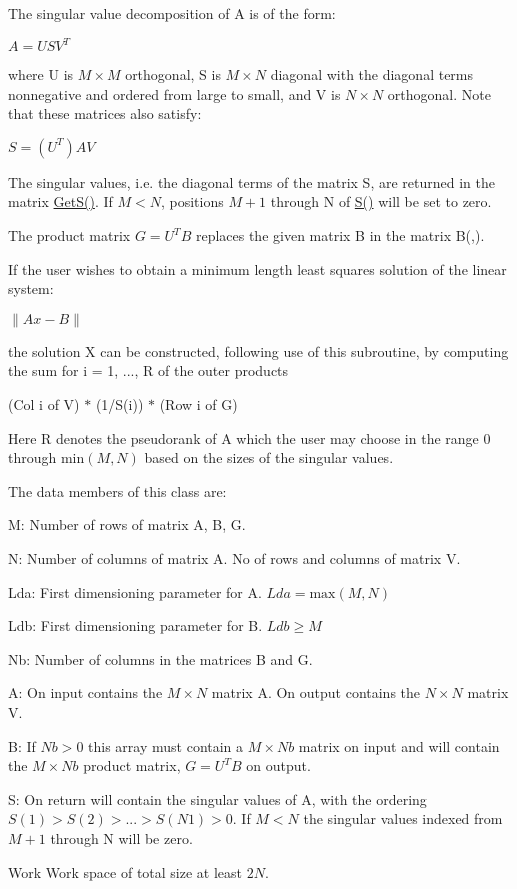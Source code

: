 The singular value decomposition of A is of the form\+:

$ A = U S V^{T} $

where U is $ M \times M $ orthogonal, S is $ M \times N $ diagonal with the diagonal terms nonnegative and ordered from large to small, and V is $ N \times N $ orthogonal. Note that these matrices also satisfy\+:

$ S = (U^{T}) A V $

The singular values, i.\+e. the diagonal terms of the matrix S, are returned in the matrix \hyperlink{classnmr_s_v_d_r_s_solver_ac73c09c7becbece05b4d1e1230b5049f}{Get\+S()}. If $ M < N $, positions $ M+1 $ through N of \hyperlink{classnmr_s_v_d_r_s_solver_a7ec50f8b0ef442501f1c0b866f337474}{S()} will be set to zero.

The product matrix $ G = U^{T} B $ replaces the given matrix B in the matrix B(,).

If the user wishes to obtain a minimum length least squares solution of the linear system\+:

$ \| Ax - B \| $

the solution X can be constructed, following use of this subroutine, by computing the sum for i = 1, ..., R of the outer products

(Col i of V) $\ast$ (1/\+S(i)) $\ast$ (Row i of G)

Here R denotes the pseudorank of A which the user may choose in the range 0 through $ \mbox{min}(M, N) $ based on the sizes of the singular values.

The data members of this class are\+:


\begin{DoxyItemize}
\item M\+: Number of rows of matrix A, B, G.
\item N\+: Number of columns of matrix A. No of rows and columns of matrix V.
\item Lda\+: First dimensioning parameter for A. $ Lda = \mbox{max}(M,N) $
\item Ldb\+: First dimensioning parameter for B. $ Ldb \geq M $
\item Nb\+: Number of columns in the matrices B and G.
\item A\+: On input contains the $ M \times N $ matrix A. On output contains the $ N \times N $ matrix V.
\item B\+: If $ Nb > 0 $ this array must contain a $ M \times Nb $ matrix on input and will contain the $ M \times Nb $ product matrix, $ G = U^{T} B $ on output.
\item S\+: On return will contain the singular values of A, with the ordering $ S(1) > S(2) > ... > S(N1) > 0 $. If $ M < N $ the singular values indexed from $ M+1 $ through N will be zero.
\item Work Work space of total size at least $ 2N $.
\end{DoxyItemize}

